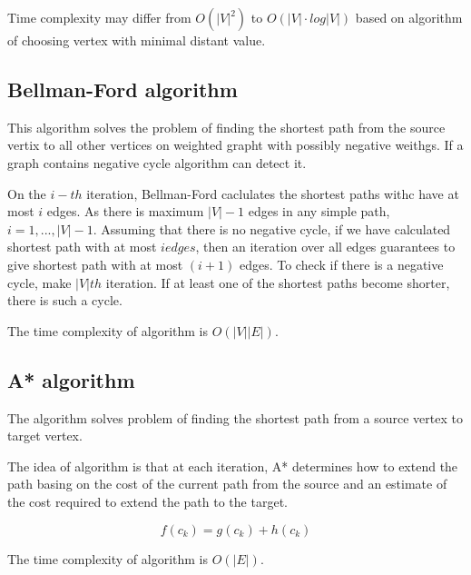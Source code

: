 Time complexity may differ from $O(|V|^2)$ to $O(|V|\cdot log|V|)$ based on algorithm of choosing vertex with minimal distant value.

\subsection*{Bellman-Ford algorithm}

This algorithm solves the problem of finding the shortest path from the source vertix to all other vertices on weighted grapht with possibly negative weithgs. If a graph contains negative cycle algorithm can detect it.

On the $i-th$ iteration, Bellman-Ford caclulates the shortest paths withc have at most $i$ edges. As there is maximum $|V| - 1$ edges in any simple path, $i = 1, ..., |V| - 1$.
Assuming that there is no negative cycle, if we have calculated shortest path with at most $i edges$, then an iteration over all edges guarantees to give shortest path with at most $(i + 1)$ edges. To check if there is a negative cycle, make $|V|th$ iteration. If at least one of the shortest paths become shorter, there is such a cycle.

The time complexity of algorithm is $O(|V||E|)$.

\subsection*{A* algorithm}

The algorithm solves problem of finding the shortest path from a source vertex to target vertex.

The idea of algorithm is that at each iteration, A* determines how to extend the path basing on the cost of the current path from the source and an estimate of the cost required to extend the path to the target. 

\begin{equation*}
    f(c_k) = g(c_k) + h(c_k)
\end{equation*}

The time complexity of algorithm is $O(|E|)$.